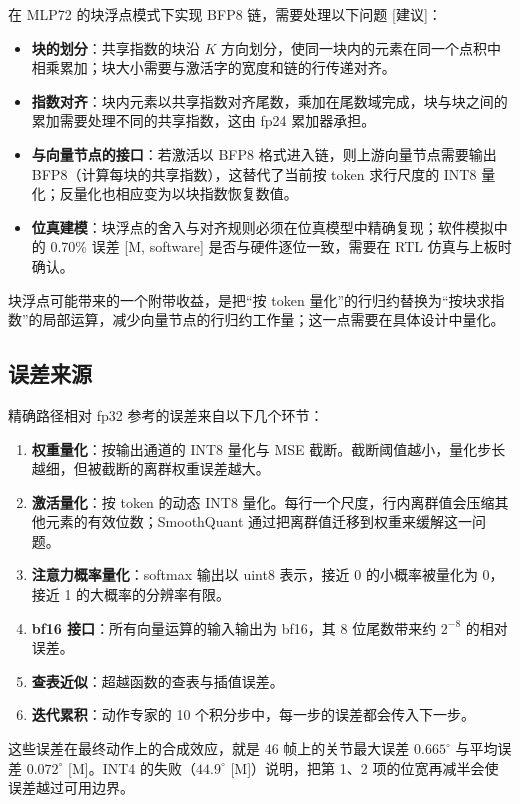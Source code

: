 \documentclass[a4paper,10.5pt]{ctexart}
\newcommand{\tM}{\textsf{[M]}}              %
\newcommand{\tMsw}{\textsf{[M, software]}}  %
\newcommand{\tR}{\textsf{[建议]}}           %
\begin{document}
在 MLP72 的块浮点模式下实现 BFP8 链，需要处理以下问题 \tR：
\begin{itemize}
  \item \textbf{块的划分}：共享指数的块沿 $K$ 方向划分，使同一块内的元素在同一个点积中相乘累加；块大小需要与激活字的宽度和链的行传递对齐。
  \item \textbf{指数对齐}：块内元素以共享指数对齐尾数，乘加在尾数域完成，块与块之间的累加需要处理不同的共享指数，这由 fp24 累加器承担。
  \item \textbf{与向量节点的接口}：若激活以 BFP8 格式进入链，则上游向量节点需要输出 BFP8（计算每块的共享指数），这替代了当前按 token 求行尺度的 INT8 量化；反量化也相应变为以块指数恢复数值。
  \item \textbf{位真建模}：块浮点的舍入与对齐规则必须在位真模型中精确复现；软件模拟中的 0.70\% 误差 \tMsw{} 是否与硬件逐位一致，需要在 RTL 仿真与上板时确认。
\end{itemize}
块浮点可能带来的一个附带收益，是把“按 token 量化”的行归约替换为“按块求指数”的局部运算，减少向量节点的行归约工作量；这一点需要在具体设计中量化。

\subsection{误差来源}

精确路径相对 fp32 参考的误差来自以下几个环节：
\begin{enumerate}
  \item \textbf{权重量化}：按输出通道的 INT8 量化与 MSE 截断。截断阈值越小，量化步长越细，但被截断的离群权重误差越大。
  \item \textbf{激活量化}：按 token 的动态 INT8 量化。每行一个尺度，行内离群值会压缩其他元素的有效位数；SmoothQuant 通过把离群值迁移到权重来缓解这一问题。
  \item \textbf{注意力概率量化}：softmax 输出以 uint8 表示，接近 0 的小概率被量化为 0，接近 1 的大概率的分辨率有限。
  \item \textbf{bf16 接口}：所有向量运算的输入输出为 bf16，其 8 位尾数带来约 $2^{-8}$ 的相对误差。
  \item \textbf{查表近似}：超越函数的查表与插值误差。
  \item \textbf{迭代累积}：动作专家的 10 个积分步中，每一步的误差都会传入下一步。
\end{enumerate}
这些误差在最终动作上的合成效应，就是 46 帧上的关节最大误差 $0.665^\circ$ 与平均误差 $0.072^\circ$ \tM。INT4 的失败（$44.9^\circ$ \tM）说明，把第 1、2 项的位宽再减半会使误差越过可用边界。
\end{document}
